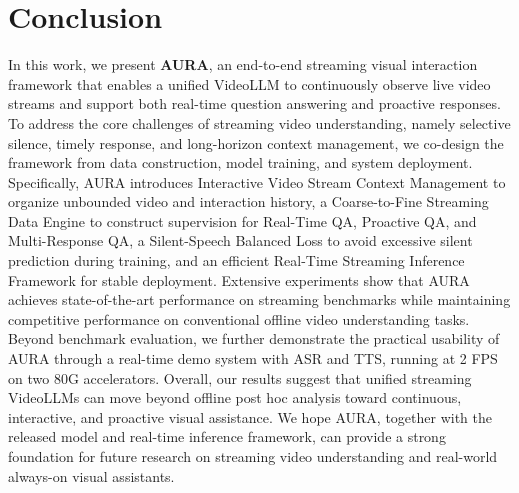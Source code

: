 \section{Conclusion}\label{sec:conclu}

In this work, we present \textbf{AURA}, an end-to-end streaming visual interaction framework that enables a unified VideoLLM to continuously observe live video streams and support both real-time question answering and proactive responses. To address the core challenges of streaming video understanding, namely selective silence, timely response, and long-horizon context management, we co-design the framework from data construction, model training, and system deployment. Specifically, AURA introduces Interactive Video Stream Context Management to organize unbounded video and interaction history, a Coarse-to-Fine Streaming Data Engine to construct supervision for Real-Time QA, Proactive QA, and Multi-Response QA, a Silent-Speech Balanced Loss to avoid excessive silent prediction during training, and an efficient Real-Time Streaming Inference Framework for stable deployment.
Extensive experiments show that AURA achieves state-of-the-art performance on streaming benchmarks while maintaining competitive performance on conventional offline video understanding tasks. Beyond benchmark evaluation, we further demonstrate the practical usability of AURA through a real-time demo system with ASR and TTS, running at 2 FPS on two 80G accelerators. Overall, our results suggest that unified streaming VideoLLMs can move beyond offline post hoc analysis toward continuous, interactive, and proactive visual assistance. We hope AURA, together with the released model and real-time inference framework, can provide a strong foundation for future research on streaming video understanding and real-world always-on visual assistants.
